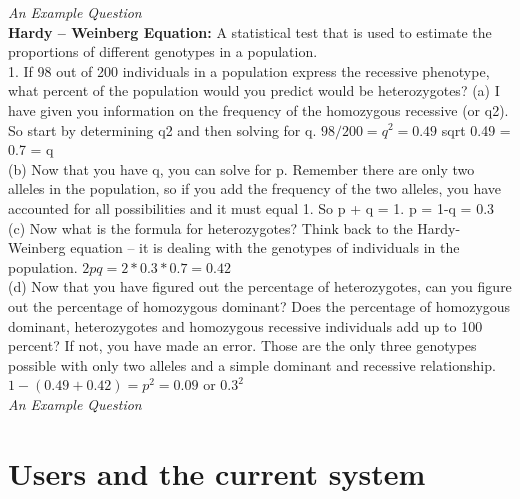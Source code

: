 \documentclass[a4paper,12pt]{report}
\begin{document}
\begin{flushleft}
	\emph{An Example Question}\\
\textbf{Hardy – Weinberg Equation:} A statistical test that is used to estimate the proportions of different genotypes in a population.\\
1. If 98 out of 200 individuals in a population express the recessive phenotype, what percent of the population would you predict would be heterozygotes?
(a) I have given you information on the frequency of the homozygous recessive (or q2). So start by determining q2 and then solving for q.  $ 98/200 =  q^2 = 0.49 $
sqrt 0.49 = 0.7 = q\\
(b) Now that you have q, you can solve for p. Remember there are only two alleles in the population, so if you add the frequency of the two alleles, you have accounted for all possibilities and it must equal 1. So p + q = 1. p = 1-q = 0.3\\
(c) Now what is the formula for heterozygotes? Think back to the Hardy-Weinberg equation -- it is dealing with the genotypes of individuals in the population.
$ 2pq = 2*0.3*0.7 = 0.42 $\\
(d) Now that you have figured out the percentage of heterozygotes, can you figure out the percentage of homozygous dominant? Does the percentage of homozygous dominant, heterozygotes and homozygous recessive individuals add up to 100 percent? If not, you have made an error. Those are the only three genotypes possible with only two alleles and a simple dominant and recessive relationship.
$ 1-(0.49 + 0.42) = p^2 = 0.09 \text{ or } 0.3^2 $\\
\emph{An Example Question}
\end{flushleft}


\section{Users and the current system}
\end{document}
